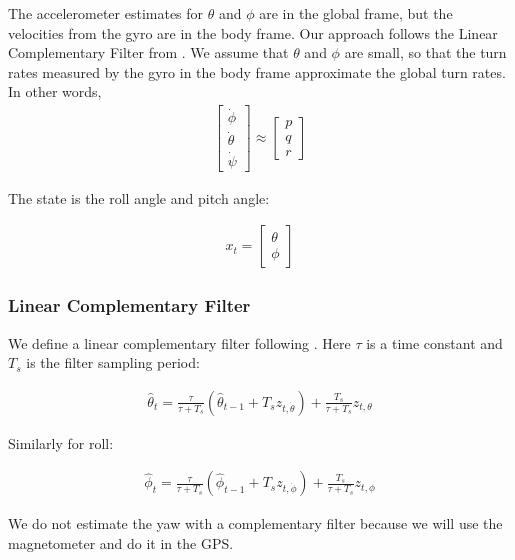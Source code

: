 \documentclass{article}
\begin{document}
The accelerometer estimates for $\theta$ and $\phi$ are in the global
frame, but the velocities from the gyro are in the body frame. Our
approach follows the Linear Complementary Filter from
\citet{quan2017introduction}.  We assume that $\theta$ and $\phi$ are
small, so that the turn rates measured by the gyro in the body frame
approximate the global turn rates.   In other words,
\begin{align}
  \left[\begin{array}{c}\dot{\phi}\\\dot{\theta}\\\dot{\psi}\end{array}\right]
  \approx
  \left[\begin{array}{c}p\\q\\r\end{array}\right]  
\end{align}

The state is the roll angle and
pitch angle:

\begin{align}
  x_t = \left[ \begin{array}{c}\theta\\\phi \end{array}\right]
\end{align}

\subsubsection{Linear Complementary Filter}


We define a linear complementary filter following
\citet{quan2017introduction}.  Here $\tau$ is a time constant and
$T_s$ is the filter sampling period:

\begin{align}
  \hat{\theta}_t = \frac{\tau}{\tau + T_s} \left( \hat{\theta}_{t-1} + T_s z_{t,\dot{\theta}} \right) + \frac{T_s}{\tau + T_s} z_{t,\theta}
\end{align}

Similarly for roll: 

\begin{align}
  \hat{\phi}_t = \frac{\tau}{\tau + T_s} \left( \hat{\phi}_{t-1} + T_s z_{t,\dot{\phi}} \right) + \frac{T_s}{\tau + T_s} z_{t,\phi}
\end{align}

We do not estimate the yaw with a complementary filter because we will
use the magnetometer and do it in the GPS.
\end{document}
